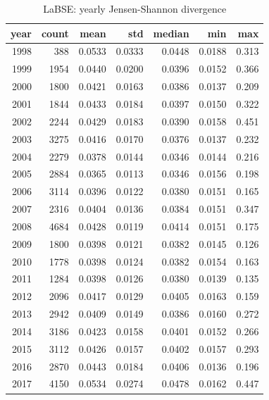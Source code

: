 \begin{table}[ht]
\centering
\caption{LaBSE: yearly Jensen-Shannon divergence}
\label{tab:labse_jsd_all_years}
\begin{tabular}{rrrrrrr}
\toprule
year & count & mean & std & median & min & max \\
\midrule
1998 & 388 & 0.0533 & 0.0333 & 0.0448 & 0.0188 & 0.313 \\
1999 & 1954 & 0.0440 & 0.0200 & 0.0396 & 0.0152 & 0.366 \\
2000 & 1800 & 0.0421 & 0.0163 & 0.0386 & 0.0137 & 0.209 \\
2001 & 1844 & 0.0433 & 0.0184 & 0.0397 & 0.0150 & 0.322 \\
2002 & 2244 & 0.0429 & 0.0183 & 0.0390 & 0.0158 & 0.451 \\
2003 & 3275 & 0.0416 & 0.0170 & 0.0376 & 0.0137 & 0.232 \\
2004 & 2279 & 0.0378 & 0.0144 & 0.0346 & 0.0144 & 0.216 \\
2005 & 2884 & 0.0365 & 0.0113 & 0.0346 & 0.0156 & 0.198 \\
2006 & 3114 & 0.0396 & 0.0122 & 0.0380 & 0.0151 & 0.165 \\
2007 & 2316 & 0.0404 & 0.0136 & 0.0384 & 0.0151 & 0.347 \\
2008 & 4684 & 0.0428 & 0.0119 & 0.0414 & 0.0151 & 0.175 \\
2009 & 1800 & 0.0398 & 0.0121 & 0.0382 & 0.0145 & 0.126 \\
2010 & 1778 & 0.0398 & 0.0124 & 0.0382 & 0.0154 & 0.163 \\
2011 & 1284 & 0.0398 & 0.0126 & 0.0380 & 0.0139 & 0.135 \\
2012 & 2096 & 0.0417 & 0.0129 & 0.0405 & 0.0163 & 0.159 \\
2013 & 2942 & 0.0409 & 0.0149 & 0.0386 & 0.0160 & 0.272 \\
2014 & 3186 & 0.0423 & 0.0158 & 0.0401 & 0.0152 & 0.266 \\
2015 & 3112 & 0.0426 & 0.0157 & 0.0402 & 0.0157 & 0.293 \\
2016 & 2870 & 0.0443 & 0.0184 & 0.0406 & 0.0136 & 0.196 \\
2017 & 4150 & 0.0534 & 0.0274 & 0.0478 & 0.0162 & 0.447 \\
\bottomrule
\end{tabular}
\end{table}

